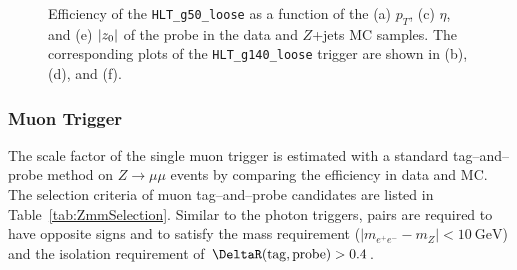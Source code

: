 \begin{figure}[!htb]
    \caption{Efficiency of the \texttt{HLT\_g50\_loose} as a function of the (a) $p_{T}$, (c) $\eta$, and (e) $|z_{0}|$ of the probe in the data and $Z$+jets MC samples. The corresponding plots of the \texttt{HLT\_g140\_loose} trigger are shown in (b), (d), and (f).
    }
    \label{fig:PhotonTrigEff}
\end{figure}




\subsubsection{Muon Trigger}
\label{subsect:muonTrigEff}

The scale factor of the single muon trigger is estimated with a standard tag--and--probe method on $Z \rightarrow \mu\mu$ events by comparing the efficiency in data and MC. The selection criteria of muon tag--and--probe candidates are listed in Table~\ref{tab:ZmmSelection}. Similar to the photon triggers, pairs are required to have opposite signs and to satisfy the mass requirement ($|m_{e^{+}e^{-}} - m_{Z}| < 10~\si{\GeV}$) and the isolation requirement of $\DeltaR(\mathrm{tag}, \mathrm{probe}) > 0.4$. 

